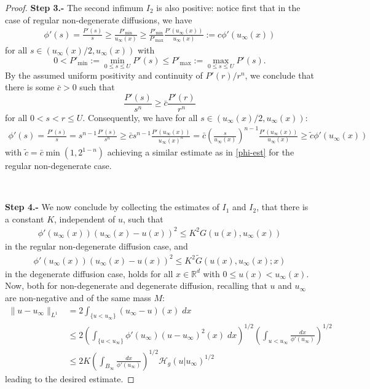 \documentclass[reqno]{amsart}
\newcommand{\R}{\mathbb{R}}
\newcommand{\uinf}{u_\infty}
\begin{document}
\begin{proof}
{\bf Step 3.-}
The second infimum $I_2$ is also positive: notice first that in the case of regular non-degenerate diffusions, we have
    \begin{align}\label{phi-est}
        \phi'(s) = \frac{P'(s)}{s} 
        \ge \frac{P'_\text{min}}{\uinf(x)} 
        \geq \frac{P'_\text{min}}{P'_{\text{max}}}  \frac{P'(\uinf(x))}{\uinf(x)}:= c\phi'(\uinf(x))
    \end{align}
for all $s\in(\uinf(x)/2,\uinf(x))$ with 
\[
    0<P'_\text{min} :=\min_{0\leq s\leq U} P'(s) \le P'_{\text{max}}:=\max_{0\leq s\leq U} P'(s). 
\]
By the assumed uniform positivity and continuity of $P'(r)/r^n$, 
we conclude that there is some $\bar c>0$ such that 
\[ 
    \frac{P'(s)}{s^n} \ge \bar c \frac{P'(r)}{r^n} 
\]
for all $0<s<r\le U$. Consequently,  we have for all $s\in(\uinf(x)/2,\uinf(x))$:
    \begin{align*}
        \phi'(s) = \frac{P'(s)}{s} 
        = s^{n-1}\frac{P'(s)}{s^n} 
        \ge \bar c s^{n-1}\frac{P'(\uinf(x))}{\uinf(x)^n}
        = \bar c\left(\frac{s}{\uinf(x)}\right)^{n-1}\frac{P'(\uinf(x))}{\uinf(x)}
        \ge \tilde c \phi'(\uinf(x))\,
    \end{align*}
with $\tilde{c}=\bar c\min(1,2^{1-n})$ achieving a similar estimate as in \eqref{phi-est} for the regular non-degenerate case.

\

{\bf Step 4.-} We now conclude by collecting the estimates of $I_1$ and $I_2$, that there is a constant $K$, independent of $u$, such that
 \begin{align*}
        \phi'(\uinf(x))(\uinf(x)-u(x))^2 \le K^2  G(u(x),\uinf(x))
    \end{align*}
in the regular non-degenerate diffusion case, and 
    \begin{align*}
        \phi'(\uinf(x))(\uinf(x)-u(x))^2 \le K^2 \tilde G(u(x),\uinf(x);x)
    \end{align*}
in the degenerate diffusion case, 
holds for all $x\in\R^d$ with $0\leq u(x)<\uinf(x)$. Now, both for non-degenerate and degenerate diffusion, recalling that $u$ and $u_\infty$ are non-negative and of the same mass $M$:
    \begin{align*}
        \|u-\uinf\|_{L^1} 
        &= 2\int_{\{u<\uinf\}} (\uinf-u)(x)\;dx \\
        & \le 2\left(\int_{\{u<\uinf\}}\phi'(\uinf)(u-\uinf)^2(x)\;dx\right)^{1/2}\left(\int_{u<\uinf}\frac{dx}{\phi'(\uinf)}\right)^{1/2} \\
        &\le 2K\left(\int_{B_\infty}\frac{dx}{\phi'(\uinf)}\right)^{1/2}\mathcal H_g(u|\uinf)^{1/2}
    \end{align*} 
leading to the desired estimate.


\end{proof}
\end{document}
